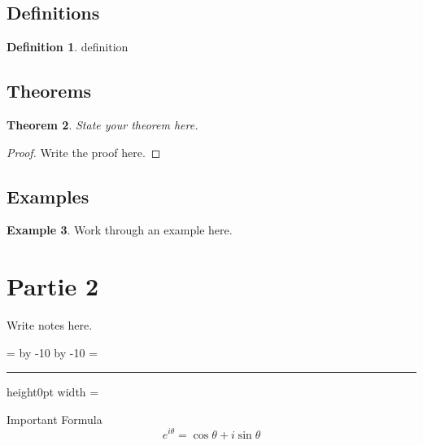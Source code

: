 \documentclass[11pt]{article}
\newtheorem{theorem}{Theorem}[section]
\theoremstyle{definition}
\newtheorem{definition}[theorem]{Definition}
\newtheorem{example}[theorem]{Example}
\theoremstyle{remark}
\newenvironment{bigbox}
{
		\begingroup
		\boxfigwidth=\hsize
		\advance\boxfigwidth by -10\fboxrule
		\advance\boxfigwidth by -10\fboxsep
		\setbox4=\vbox\bgroup
		\hsize\boxfigwidth
		\hrule height0pt width\boxfigwidth
		\smallskip
		\linewidth=\boxfigwidth
}
{
		\smallskip
		\egroup
		\fbox{\box4}
		\endgroup
}
\begin{document}
\subsection{Definitions}

\begin{definition}
		definition
\end{definition}

\subsection{Theorems}

\begin{theorem}
		State your theorem here.
\end{theorem}

\begin{proof}
		Write the proof here.
\end{proof}

\subsection{Examples}

\begin{example}
		Work through an example here.
\end{example}

\section{Partie 2}

Write notes here.

\begin{bigbox}
		\centering
		\Large
		Important Formula
		\[
				e^{i\theta}=\cos\theta+i\sin\theta
		\]
\end{bigbox}
\end{document}
